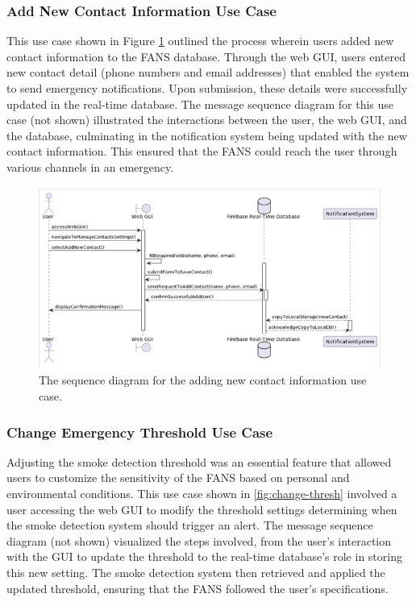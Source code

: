 \subsubsection{Add New Contact Information Use Case}

This use case shown in Figure \ref{fig:add-contact} outlined the process wherein users added new contact information
to the FANS database. Through the web GUI, users entered new contact detail (phone numbers and email addresses) that
enabled the system to send emergency notifications. Upon submission, these details were successfully updated in the
real-time database. The message sequence diagram for this use case (not shown) illustrated the interactions between the
user, the web GUI, and the database, culminating in the notification system being updated with the new contact
information. This ensured that the FANS could reach the user through various channels in an emergency.

\begin{figure}
    \centering
    \includegraphics[width=\imagewidth]{../assets/sequence/AddingNewContactInformationSequenceDiagram.png}
    \caption{The sequence diagram for the adding new contact information use case.}
    \label{fig:add-contact}
\end{figure}

\subsubsection{Change Emergency Threshold Use Case}

Adjusting the smoke detection threshold was an essential feature that allowed users to customize the sensitivity of the
FANS based on personal and environmental conditions. This use case shown in \ref{fig:change-thresh}
involved a user accessing the web GUI to modify the threshold settings determining when the smoke detection system
should trigger an alert. The message sequence diagram (not shown) visualized the steps involved, from the user’s
interaction with the GUI to update the threshold to the real-time database’s role in storing this new setting. The
smoke detection system then retrieved and applied the updated threshold, ensuring that the FANS followed
the user’s specifications.

